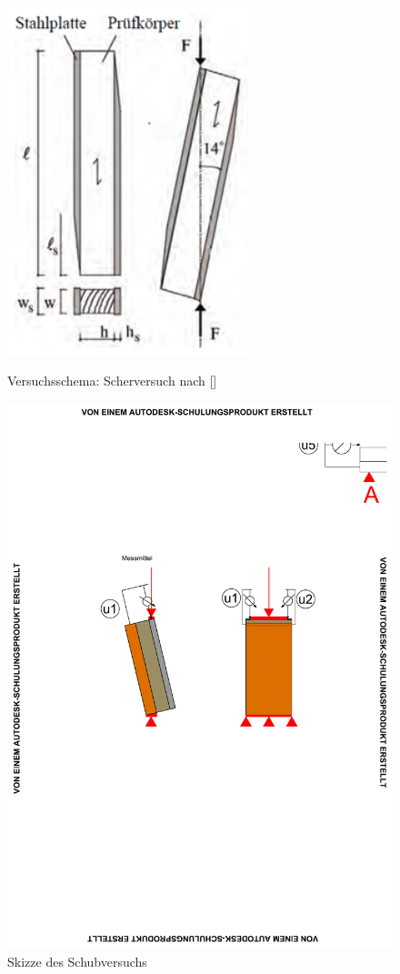 \begin{figure}[h!]
\begin{minipage}[hbt]{7cm}
	\includegraphics[width=7cm]{Auswertung/1versuch/versuchsschema_scherversuch.png}
	\caption{Versuchsschema: Scherversuch nach []}
	\label{versuchsschema_scherversuch}
\end{minipage}
\hfill
\begin{minipage}[hbt]{7cm}
\includegraphics[scale=1.2, trim=4cm 12cm 11.5cm 9cm, clip=true]{Auswertung/schubversuch/Schubversuch_Skizze.pdf}
	\caption{Skizze des Schubversuchs}
	\label{abb:Skizze des Schubversuchs}
\end{minipage}
\end{figure}


